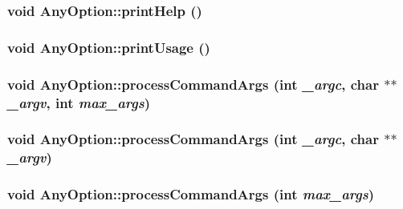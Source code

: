 \label{classAnyOption_a531b07829ead5a4a292ff2f0b3be8f9a}
\hypertarget{classAnyOption_ad10117aa56fe321efbbf0b90bc6ca124}{
\subsubsection[{printHelp}]{\setlength{\rightskip}{0pt plus 5cm}void AnyOption::printHelp ()}}
\label{classAnyOption_ad10117aa56fe321efbbf0b90bc6ca124}
\hypertarget{classAnyOption_a27d72b5ea4ab75eaeb74207b2165b1fe}{
\subsubsection[{printUsage}]{\setlength{\rightskip}{0pt plus 5cm}void AnyOption::printUsage ()}}
\label{classAnyOption_a27d72b5ea4ab75eaeb74207b2165b1fe}
\hypertarget{classAnyOption_a3722651e433d69c380f88f76075d7809}{
\subsubsection[{processCommandArgs}]{\setlength{\rightskip}{0pt plus 5cm}void AnyOption::processCommandArgs (int {\em \_\-argc}, \/  char $\ast$$\ast$ {\em \_\-argv}, \/  int {\em max\_\-args})}}
\label{classAnyOption_a3722651e433d69c380f88f76075d7809}
\hypertarget{classAnyOption_a6eb4b1407b58fff76dd94d41f3c5af72}{
\subsubsection[{processCommandArgs}]{\setlength{\rightskip}{0pt plus 5cm}void AnyOption::processCommandArgs (int {\em \_\-argc}, \/  char $\ast$$\ast$ {\em \_\-argv})}}
\label{classAnyOption_a6eb4b1407b58fff76dd94d41f3c5af72}
\hypertarget{classAnyOption_acbb92b2ed06429530419797e27a66835}{
\subsubsection[{processCommandArgs}]{\setlength{\rightskip}{0pt plus 5cm}void AnyOption::processCommandArgs (int {\em max\_\-args})}}
